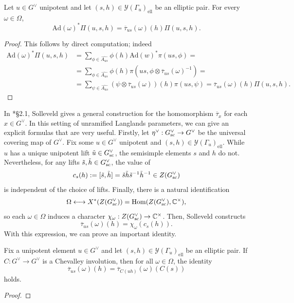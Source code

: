 \begin{lemma}\label{lem:action_on_Pi}
    Let $u\in G^\vee$ unipotent and let $(s,h)\in\mathcal{Y}(\Gamma_u)_{\mathrm{ell}}$ be an elliptic pair. For every $\omega\in\Omega$, 
    $$\mathrm{Ad}(\omega)^*\Pi(u,s,h)=\overline{\tau}_{us}(\omega)(h)\Pi(u,s,h).$$
\end{lemma}
\begin{proof}
    This follows by direct computation; indeed
    \begin{align*}
        \mathrm{Ad}(\omega)^*\Pi(u,s,h)&=\sum_{\phi\in\widehat{A_{us}}}\phi(h)\mathrm{Ad}(w)^*\pi(us,\phi)=\\
        &=\sum_{\phi\in\widehat{A_{us}}}\phi(h)\pi(us,\phi\otimes\overline{\tau}_{us}(\omega)^{-1})=\\
        &=\sum_{\psi\in\widehat{A_{us}}}(\psi\otimes\overline{\tau}_{us}(\omega))(h)\pi(us,\psi)=\overline{\tau}_{us}(\omega)(h)\Pi(u,s,h).
    \end{align*} 
\end{proof}

In \cite{Solleveld2020}*{\S2.1}, Solleveld gives a general construction for the homomorphism $\overline{\tau}_x$ for each $x\in G^\vee$. In this setting of unramified Langlands parameters, we can give an explicit formulas that are very useful. Firstly, let $\eta^\vee:G^\vee_{\mathrm{sc}}\to G^\vee$ be the universal covering map of $G^\vee$. Fix some $u\in G^\vee$ unipotent and $(s,h)\in\mathcal{Y}(\Gamma_u)_{\mathrm{ell}}$. While $u$ has a unique unipotent lift $\tilde{u}\in G^\vee_{\mathrm{sc}}$, the semisimple elements $s$ and $h$ do not. Nevertheless, for any lifts $\tilde{s},\tilde{h}\in G^\vee_{\mathrm{sc}}$, the value of
$$c_s(h):=[\tilde{s},\tilde{h}]=\tilde{s}\tilde{h}\tilde{s}^{-1}\tilde{h}^{-1}\in Z(G^\vee_{\mathrm{sc}})$$
is independent of the choice of lifts. Finally, there is a natural identification
$$\Omega\longleftrightarrow X^*(Z(G^\vee_{\mathrm{sc}}))=\mathrm{Hom}(Z(G^\vee_{\mathrm{sc}}),\mathbb{C}^\times),$$
so each $\omega\in\Omega$ induces a character $\chi_\omega:Z(G^\vee_{\mathrm{sc}})\to\mathbb{C}^\times$. Then, Solleveld constructs
\begin{equation}
    \overline{\tau}_{us}(\omega)(h)=\chi_\omega(c_s(h)).
\end{equation}
With this expression, we can prove an important identity.
\begin{proposition}\label{prop:identity_tau}
    Fix a unipotent element $u\in G^\vee$ and let $(s,h)\in\mathcal{Y}(\Gamma_u)_{\mathrm{ell}}$ be an elliptic pair. If $C:G^\vee\to G^\vee$ is a Chevalley involution, then for all $\omega\in\Omega$, the identity
    \begin{equation}
        \overline{\tau}_{us}(\omega)(h)=\overline{\tau}_{C(uh)}(\omega)(C(s))
    \end{equation}
    holds.
\end{proposition}
\begin{proof}
    
\end{proof}


